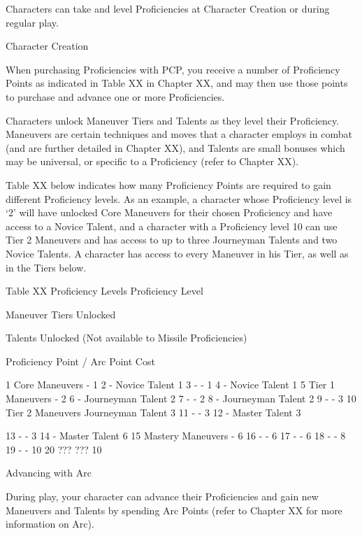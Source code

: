 \documentclass[oneside,11pt,english]{book}
\begin{document}
 

Characters can take and level Proficiencies at Character Creation or during regular play. 

 

Character Creation 

 

When purchasing Proficiencies with PCP, you receive a number of Proficiency Points as indicated in 
Table XX in Chapter XX, and may then use those points to purchase and advance one or more 
Proficiencies. 

 

Characters unlock Maneuver Tiers and Talents as they level their Proficiency. Maneuvers are certain 
techniques and moves that a character employs in combat (and are further detailed in Chapter XX), and 
Talents are small bonuses which may be universal, or specific to a Proficiency (refer to Chapter XX). 

 

Table XX below indicates how many Proficiency Points are required to gain different Proficiency levels. 
As an example, a character whose Proficiency level is ‘2’ will have unlocked Core Maneuvers for their 
chosen Proficiency and have access to a Novice Talent, and a character with a Proficiency level 10 can 
use Tier 2 Maneuvers and has access to up to three Journeyman Talents and two Novice Talents. A 
character has access to every Maneuver in his Tier, as well as in the Tiers below. 

 
Table XX Proficiency Levels 
Proficiency 
Level 

Maneuver Tiers 
Unlocked 

Talents Unlocked 
(Not available to Missile 
Proficiencies) 

Proficiency Point / Arc Point 
Cost 

1 Core Maneuvers - 1 
2 - Novice Talent 1 
3 - - 1 
4 - Novice Talent 1 
5 Tier 1 Maneuvers - 2 
6 - Journeyman Talent 2 
7 - - 2 
8 - Journeyman Talent 2 
9 - - 3 
10 Tier 2 Maneuvers Journeyman Talent 3 
11 - - 3 
12 - Master Talent 3 


13 - - 3 
14 - Master Talent 6 
15 Mastery Maneuvers - 6 
16 - - 6 
17 - - 6 
18 - - 8 
19 - - 10 
20 ??? ??? 10 

 

Advancing with Arc 

 

During play, your character can advance their Proficiencies and gain new Maneuvers and Talents by 
spending Arc Points (refer to Chapter XX for more information on Arc). 
\end{document}
